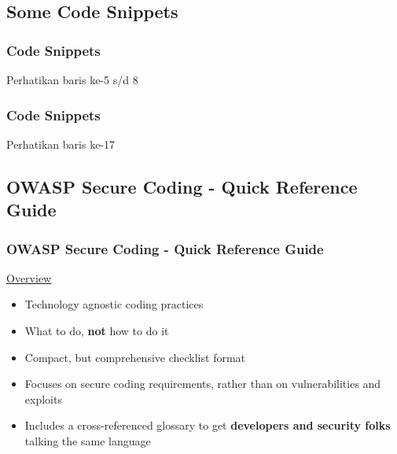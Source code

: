 \documentclass[xcolor=pdftex,table,handouts]{beamer}
\begin{document}
\subsection{Some Code Snippets}

\begin{frame}[fragile]
	\frametitle{Code Snippets}
			
	\begin{center}
	Perhatikan baris ke-5 s/d 8
	\end{center}
\end{frame}

\begin{frame}[fragile]
	\frametitle{Code Snippets}
			
	\begin{center}
		Perhatikan baris ke-17
	\end{center}
\end{frame}

\subsection{OWASP Secure Coding - Quick Reference Guide}

\begin{frame}
	\frametitle{OWASP Secure Coding - Quick Reference Guide}
	\underline{Overview}
	\begin{itemize}
		\item Technology agnostic coding practices \pause
		\item What to do, \textbf{not} how to do it \pause
		\item Compact, but comprehensive checklist format \pause
		\item Focuses on secure coding requirements, rather than on vulnerabilities and exploits \pause
		\item Includes a cross-referenced glossary to get \textbf{developers and security folks} talking the same language
	\end{itemize}
\end{frame}
\end{document}
